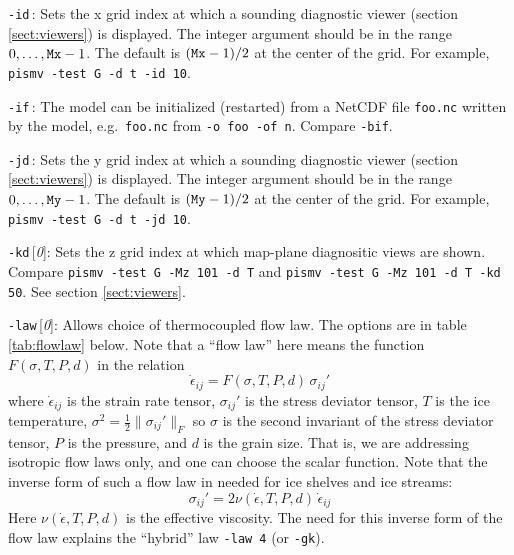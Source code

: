 \documentclass[11pt,final]{amsart}
\renewcommand{\t}[1]{\texttt{#1}}
\newcommand{\eps}{\epsilon}
\newcommand{\rawopt}[1]{\vspace{1mm}\noindent \large\texttt{-#1}\normalsize}
\newcommand{\opt}[1]{\rawopt{#1}\,:\quad}
\newcommand{\optdef}[2]{\rawopt{#1}\,[\textsl{#2}]:\quad}
\begin{document}
\opt{id}  Sets the x grid index at which a sounding diagnostic viewer (section \ref{sect:viewers}) is displayed.  The integer argument should be in the range $0,\dots,\text{\t{Mx}}-1$.  The default is $(\text{\t{Mx}}-1)/2$ at the center of the grid.  For example, \verb|pismv -test G -d t -id 10|.

\opt{if}  The model can be initialized (restarted) from a NetCDF file \verb|foo.nc| written by the model, e.g.~\verb|foo.nc| from \verb|-o foo -of n|.  Compare \verb|-bif|.

\opt{jd}  Sets the y grid index at which a sounding diagnostic viewer (section \ref{sect:viewers}) is displayed.  The integer argument should be in the range $0,\dots,\text{\t{My}}-1$.  The default is $(\text{\t{My}}-1)/2$ at the center of the grid.  For example, \verb|pismv -test G -d t -jd 10|.

\optdef{kd}{0}  Sets the z grid index at which map-plane diagnositic views are shown.  Compare \verb|pismv -test G -Mz 101 -d T| and \verb|pismv -test G -Mz 101 -d T -kd 50|.  See section \ref{sect:viewers}.

\optdef{law}{0}  Allows choice of thermocoupled flow law.  The options are in table \ref{tab:flowlaw} below.  Note that a ``flow law'' here means the function $F(\sigma,T,P,d)$ in the relation
	$$\dot \eps_{ij} = F(\sigma,T,P,d)\, \sigma_{ij}'$$
where $\dot \eps_{ij}$ is the strain rate tensor, $\sigma_{ij}'$ is the stress deviator tensor, $T$ is the ice temperature, $\sigma^2 = \frac{1}{2} \|\sigma_{ij}'\|_F$ so $\sigma$ is the second invariant of the stress deviator tensor, $P$ is the pressure, and $d$ is the grain size.  That is, we are addressing isotropic flow laws only, and one can choose the scalar function.  Note that the inverse form of such a flow law in needed for ice shelves and ice streams:
	$$\sigma_{ij}' = 2 \nu(\dot\eps,T,P,d)\,\dot \eps_{ij} $$
Here $\nu(\dot \eps,T,P,d)$ is the effective viscosity.  The need for this inverse form of the flow law explains the ``hybrid'' law \verb|-law 4| (or \verb|-gk|).
\end{document}
